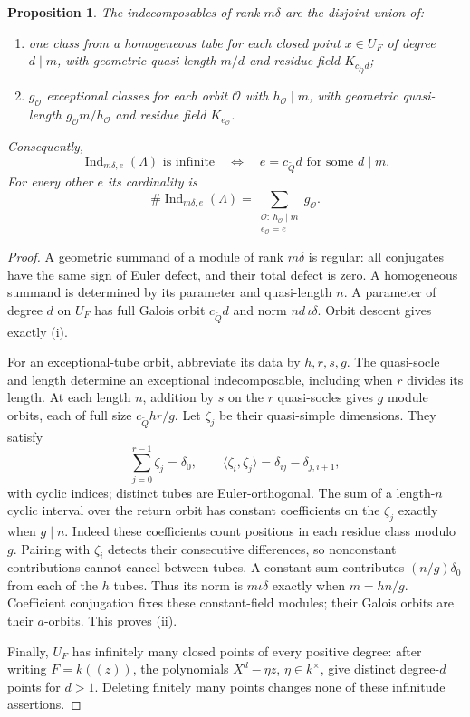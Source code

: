 \documentclass[11pt, reqno]{amsart}
\numberwithin{equation}{section}
\newtheorem{proposition}[theorem]{Proposition}
\theoremstyle{definition}
\theoremstyle{remark}
\newcommand{\op}[1]{\operatorname{#1}}
\newcommand{\mc}[1]{\mathcal{#1}}
\newcommand{\OO}{\mc O}
\newcommand{\Ind}{\op{Ind}}
\newcommand{\Qbar}{\widetilde Q}
\newcommand{\unfoldcomp}{{c_{\Qbar}}}
\begin{document}
\begin{proposition}\label{prop:affine-strata}
The indecomposables of rank $m\delta$ are the disjoint union of:
\begin{enumerate}
\item one class from a homogeneous tube for each closed point $x\in U_F$ of degree
$d\mid m$, with geometric quasi-length $m/d$ and residue field $K_{\unfoldcomp d}$;
\item $g_{\OO}$ exceptional classes for each orbit $\OO$
with $h_{\OO}\mid m$, with geometric quasi-length
$g_{\OO}m/h_{\OO}$ and residue field $K_{e_{\OO}}$.
\end{enumerate}
Consequently,
\[ \Ind_{m\delta,e}(\Lambda)\text{ is infinite} \quad\Longleftrightarrow\quad e=\unfoldcomp d\text{ for some }d\mid m. \]
For every other $e$ its cardinality is
\[ \#\Ind_{m\delta,e}(\Lambda) =\sum_{\substack{\OO:\ h_{\OO}\mid m\\e_{\OO}=e}} g_{\OO}. \]
\end{proposition}
\begin{proof}
A geometric summand of a module of rank $m\delta$ is regular:
all conjugates have the same sign of Euler defect, and their total
defect is zero. A homogeneous summand is determined by its parameter
and quasi-length $n$. A parameter of degree $d$ on $U_F$ has full
Galois orbit $\unfoldcomp d$ and norm $nd\,\iota\delta$. Orbit descent gives
exactly (i).

For an exceptional-tube orbit, abbreviate its data by $h,r,s,g$. The quasi-socle
and length determine an exceptional indecomposable, including when
$r$ divides its length. At each length $n$, addition by $s$ on the
$r$ quasi-socles gives $g$ module orbits, each of full size $\unfoldcomp hr/g$.
Let $\zeta_j$ be their quasi-simple dimensions. They satisfy
\[ \sum_{j=0}^{r-1}\zeta_j=\delta_0,\qquad \langle\zeta_i,\zeta_j\rangle =\delta_{ij}-\delta_{j,i+1}, \]
with cyclic indices; distinct tubes are Euler-orthogonal.
The sum of a length-$n$ cyclic interval over the return orbit has
constant coefficients on the $\zeta_j$ exactly when $g\mid n$.
Indeed these coefficients count positions in each residue class modulo
$g$. Pairing with $\zeta_i$ detects their consecutive differences,
so nonconstant contributions cannot cancel between tubes. A constant
sum contributes $(n/g)\delta_0$ from each of the $h$ tubes. Thus its
norm is $m\iota\delta$ exactly when $m=hn/g$.
Coefficient conjugation fixes these constant-field modules; their
Galois orbits are their $a$-orbits. This proves (ii).

Finally, $U_F$ has infinitely many closed points of every positive
degree: after writing $F=k((z))$, the polynomials $X^d-\eta z$,
$\eta\in k^\times$, give distinct degree-$d$ points for $d>1$.
Deleting finitely many points changes none of these infinitude assertions.
\end{proof}
\end{document}
